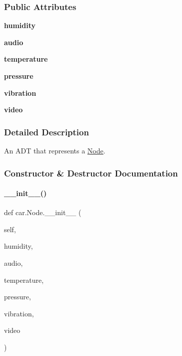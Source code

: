\subsubsection*{Public Attributes}
\begin{DoxyCompactItemize}
\item 
\mbox{\label{classcar_1_1_node_a0b5e573792e56eb987c41cb7157cc522}} 
{\bfseries humidity}
\item 
\mbox{\label{classcar_1_1_node_a61a9dc9033a515e7840aabe7f26d8ffa}} 
{\bfseries audio}
\item 
\mbox{\label{classcar_1_1_node_ad5f4e3b941dffecb60336937b906b59e}} 
{\bfseries temperature}
\item 
\mbox{\label{classcar_1_1_node_a958855c08077a3d620840e2907bea414}} 
{\bfseries pressure}
\item 
\mbox{\label{classcar_1_1_node_ab513b423faf21c9e651cf4ba2193f416}} 
{\bfseries vibration}
\item 
\mbox{\label{classcar_1_1_node_a4ce93d452773a20db7202a532fa1d2a4}} 
{\bfseries video}
\end{DoxyCompactItemize}


\subsubsection{Detailed Description}
An A\+DT that represents a \mbox{\hyperlink{classcar_1_1_node}{Node}}. 

\subsubsection{Constructor \& Destructor Documentation}
\mbox{\label{classcar_1_1_node_af91e35ad2eaf8e4eba35f04a20f15820}} 
\paragraph{\texorpdfstring{\_\_init\_\_()}{\_\_init\_\_()}}
{\footnotesize\ttfamily def car.\+Node.\+\_\+\+\_\+init\+\_\+\+\_\+ (\begin{DoxyParamCaption}\item[{}]{self,  }\item[{}]{humidity,  }\item[{}]{audio,  }\item[{}]{temperature,  }\item[{}]{pressure,  }\item[{}]{vibration,  }\item[{}]{video }\end{DoxyParamCaption})}



